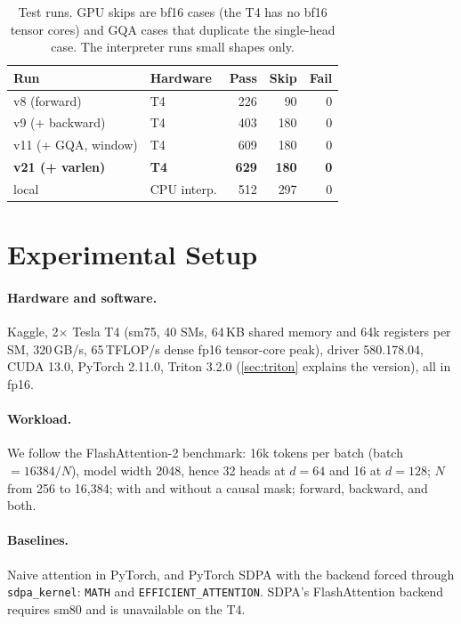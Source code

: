 \documentclass[10pt,twocolumn,letterpaper]{article}
\newcommand{\TF}{\,TFLOP/s}
\begin{document}
\begin{table}[t]
\centering
\footnotesize
\setlength{\tabcolsep}{4pt}
\begin{tabular}{@{}llrrr@{}}
\toprule
Run & Hardware & Pass & Skip & Fail \\
\midrule
v8 (forward) & T4 & 226 & 90 & 0 \\
v9 (+ backward) & T4 & 403 & 180 & 0 \\
v11 (+ GQA, window) & T4 & 609 & 180 & 0 \\
\textbf{v21 (+ varlen)} & \textbf{T4} & \textbf{629} & \textbf{180} & \textbf{0} \\
local & CPU interp. & 512 & 297 & 0 \\
\bottomrule
\end{tabular}
\caption{Test runs. GPU skips are bf16 cases (the T4 has no bf16 tensor
cores) and GQA cases that duplicate the single-head case. The interpreter
runs small shapes only.}
\label{tab:tests}
\end{table}

\section{Experimental Setup}
\label{sec:setup}

\paragraph{Hardware and software.}
Kaggle, 2$\times$ Tesla T4 (sm75, 40 SMs, 64\,KB shared memory and 64k
registers per SM, 320\,GB/s, 65\TF{} dense fp16 tensor-core peak), driver
580.178.04, CUDA 13.0, PyTorch 2.11.0, Triton 3.2.0 (\cref{sec:triton}
explains the version), all in fp16.

\paragraph{Workload.}
We follow the FlashAttention-2 benchmark: 16k tokens per batch
(batch $= 16384/N$), model width 2048, hence 32 heads at $d = 64$ and 16 at
$d = 128$; $N$ from 256 to 16,384; with and without a causal mask; forward,
backward, and both.

\paragraph{Baselines.}
Naive attention in PyTorch, and PyTorch SDPA with the backend forced through
\texttt{sdpa\_kernel}: \texttt{MATH} and \texttt{EFFICIENT\_ATTENTION}. SDPA's
FlashAttention backend requires sm80 and is unavailable on the T4.
\end{document}
